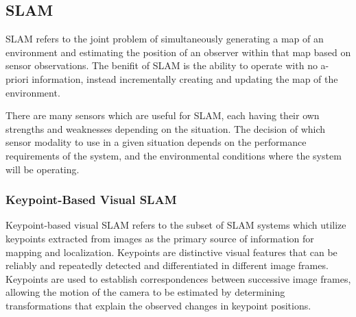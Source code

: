 \subsection{SLAM}

SLAM refers to the joint problem of simultaneously generating a map of an environment and estimating the position of an observer within that map based on sensor observations. The benifit of SLAM is the ability to operate with no a-priori information, instead incrementally creating and updating the map of the environment.

There are many sensors which are useful for SLAM, each having their own strengths and weaknesses depending on the situation. The decision of which sensor modality to use in a given situation depends on the performance requirements of the system, and the environmental conditions where the system will be operating.

\subsubsection{Keypoint-Based Visual SLAM}

Keypoint-based visual SLAM refers to the subset of SLAM systems which utilize keypoints extracted from images as the primary source of information for mapping and localization. Keypoints are distinctive visual features that can be reliably and repeatedly detected and differentiated in different image frames. Keypoints are used to establish correspondences between successive image frames, allowing the motion of the camera to be estimated by determining transformations that explain the observed changes in keypoint positions.

% 


